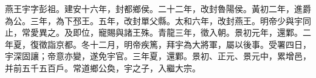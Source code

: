 \begin{pinyinscope}
 
 
 燕王宇字彭祖。建安十六年，封都鄉侯。二十二年，改封魯陽侯。黃初二年，進爵為公。三年，為下邳王。五年，改封單父縣。太和六年，改封燕王。明帝少與宇同止，常愛異之。及即位，寵賜與諸王殊。青龍三年，徵入朝。景初元年，還鄴。二年夏，復徵詣京都。冬十二月，明帝疾篤，拜宇為大將軍，屬以後事。受署四日，宇深固讓；帝意亦變，遂免宇官。三年夏，還鄴。景初、正元、景元中，累增邑，并前五千五百戶。常道鄉公奐，宇之子，入繼大宗。
 
 
\end{pinyinscope}
